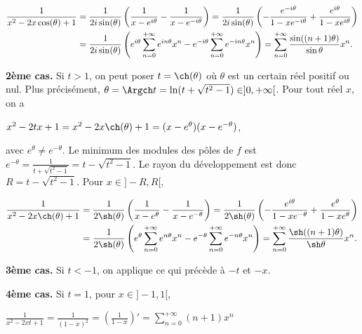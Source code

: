 {{\begin{align*}\ensuremath
 \frac{1}{x^2-2x\cos(\theta)+1}&=\frac{1}{2i\sin(\theta)}\left(\frac{1}{x-e^{i\theta}}-\frac{1}{x-e^{-i\theta}}\right) =\frac{1}{2i\sin(\theta)}\left(-\frac{e^{-i\theta}}{1-xe^{-i\theta}}+\frac{e^{i\theta}}{1-xe^{i\theta}}\right)\\
  &=\frac{1}{2i\sin(\theta)}\left(e^{i\theta}\sum_{n=0}^{+\infty}e^{in\theta}x^n-e^{-i\theta}\sum_{n=0}^{+\infty}e^{-in\theta}x^n\right) =\sum_{n=0}^{+\infty}\frac{\sin((n+1)\theta)}{\sin\theta}x^n.
\end{align*}

\begin{center}
\fbox{
$\forall t\in]-1,1[$, $\forall x\in]-1,1[$, $\frac{1}{x^2-2xt+1}=\sum_{n=0}^{+\infty}\frac{\sin((n+1)\theta)}{\sin\theta}x^n$ où $\theta=\Arccos t$.
}
\end{center}

\textbf{2ème cas.} Si $t > 1$, on peut poser $t =\ch(\theta)$ où $\theta$ est un certain réel positif ou nul. Plus précisément, $\theta=\Argch t=\ln(t+\sqrt{t^2-1})\in]0,+\infty[$. Pour tout réel $x$, on a

\begin{center}
$x^2 -2tx +1 =x^2 -2x\ch(\theta)+1=(x-e^{\theta})(x-e^{-\theta})$,
\end{center}

avec $e^\theta\neq e^{-\theta}$. Le minimum des modules des pôles de $f$ est $e^{-\theta}=\frac{1}{t+\sqrt{t^2-1}}= t-\sqrt{t^2-1}$. Le rayon du développement est donc $R=t-\sqrt{t^2-1}$. Pour $x\in]-R,R[$,

\begin{align*}\ensuremath
\frac{1}{x^2-2x\ch(\theta)+1}&=\frac{1}{2\sh(\theta)}\left(\frac{1}{x-e^{\theta}}-\frac{1}{x-e^{-\theta}}\right) =\frac{1}{2\sh(\theta)}\left(-\frac{e^{i\theta}}{1-xe^{-\theta}}+\frac{e^{\theta}}{1-xe^{\theta}}\right)\\
  &=\frac{1}{2\sh(\theta)}\left(e^{\theta}\sum_{n=0}^{+\infty}e^{n\theta}x^n-e^{-\theta}\sum_{n=0}^{+\infty}e^{-n\theta}x^n\right) =\sum_{n=0}^{+\infty}\frac{\sh((n+1)\theta)}{\sh\theta}x^n.
\end{align*}

\textbf{3ème cas.} Si $t < -1$, on applique ce qui précède à $-t$ et $-x$.

\textbf{4ème cas.} Si $t = 1$, pour $x\in]-1,1[$,

\begin{center}
$\frac{1}{x^2-2xt+1}=\frac{1}{(1-x)^2}=\left(\frac{1}{1-x}\right)'=\sum_{n=0}^{+\infty}(n+1)x^n$
\end{center}

}}
